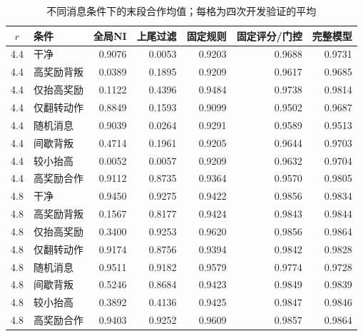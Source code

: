 \begin{table}[!htbp]
\centering\small
\caption{不同消息条件下的末段合作均值；每格为四次开发验证的平均}
\label{tab:w2-message-generalization}
\begin{tabular}{clrrrrr}
\toprule
$r$ & 条件 & 全局NI & 上尾过滤 & 固定规则 & 固定评分/门控 & 完整模型 \\
\midrule
4.4 & 干净 & 0.9076 & 0.0053 & 0.9203 & 0.9688 & 0.9731 \\
4.4 & 高奖励背叛 & 0.0389 & 0.1895 & 0.9209 & 0.9617 & 0.9685 \\
4.4 & 仅抬高奖励 & 0.1122 & 0.4396 & 0.9484 & 0.9738 & 0.9814 \\
4.4 & 仅翻转动作 & 0.8849 & 0.1593 & 0.9099 & 0.9502 & 0.9687 \\
4.4 & 随机消息 & 0.9039 & 0.0264 & 0.9291 & 0.9589 & 0.9513 \\
4.4 & 间歇背叛 & 0.4714 & 0.1961 & 0.9205 & 0.9644 & 0.9703 \\
4.4 & 较小抬高 & 0.0052 & 0.0057 & 0.9209 & 0.9632 & 0.9704 \\
4.4 & 高奖励合作 & 0.9112 & 0.8735 & 0.9364 & 0.9570 & 0.9805 \\
\midrule
4.8 & 干净 & 0.9450 & 0.9275 & 0.9422 & 0.9856 & 0.9834 \\
4.8 & 高奖励背叛 & 0.1567 & 0.8177 & 0.9424 & 0.9843 & 0.9844 \\
4.8 & 仅抬高奖励 & 0.3400 & 0.9253 & 0.9620 & 0.9856 & 0.9864 \\
4.8 & 仅翻转动作 & 0.9174 & 0.8756 & 0.9394 & 0.9842 & 0.9828 \\
4.8 & 随机消息 & 0.9511 & 0.9182 & 0.9579 & 0.9774 & 0.9728 \\
4.8 & 间歇背叛 & 0.5246 & 0.8684 & 0.9423 & 0.9849 & 0.9839 \\
4.8 & 较小抬高 & 0.3892 & 0.4136 & 0.9425 & 0.9847 & 0.9846 \\
4.8 & 高奖励合作 & 0.9403 & 0.9252 & 0.9609 & 0.9857 & 0.9864 \\
\bottomrule
\end{tabular}
\par{}
\end{table}
